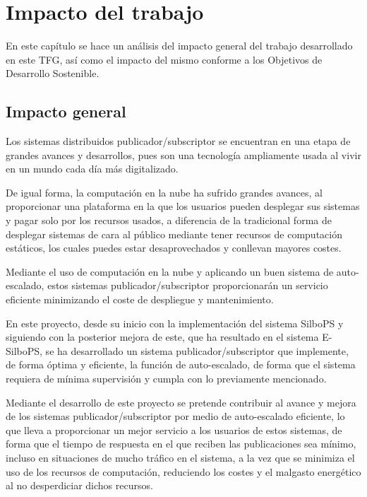 \chapter{Impacto del trabajo} \label{chp:impacto}

En este capítulo se hace un análisis del impacto general del trabajo 
desarrollado en este TFG, así como el impacto del mismo conforme a los 
Objetivos de Desarrollo Sostenible.


\section{Impacto general} \label{sct:impacto_impactogeneral}

Los sistemas distribuidos publicador/subscriptor se encuentran en una etapa de
grandes avances y desarrollos, pues son una tecnología ampliamente usada al 
vivir en un mundo cada día más digitalizado. 

De igual forma, la computación en la nube ha sufrido grandes avances, al 
proporcionar una plataforma en la que los usuarios pueden desplegar sus sistemas
y pagar solo por los recursos usados, a diferencia de la tradicional forma de 
desplegar sistemas de cara al público mediante tener recursos de computación 
estáticos, los cuales puedes estar desaprovechados y conllevan mayores costes.

Mediante el uso de computación en la nube y aplicando un buen sistema de 
auto-escalado, estos sistemas publicador/subscriptor proporcionarán un servicio
eficiente minimizando el coste de despliegue y mantenimiento.

En este proyecto, desde su inicio con la implementación del sistema
SilboPS\cite{thesis:tesisSVavassori} y siguiendo con la posterior mejora de 
este, que ha resultado en el sistema 
E-SilboPS\cite{tfm:victor2017}\cite{thesis:tesisVictor}, se ha desarrollado 
un sistema publicador/subscriptor que implemente, de forma óptima 
y eficiente, la función de auto-escalado, de forma que el sistema requiera
de mínima supervisión y cumpla con lo previamente mencionado.

Mediante el desarrollo de este proyecto se pretende contribuir al avance y 
mejora de los sistemas publicador/subscriptor por medio de auto-escalado 
eficiente, lo que lleva a proporcionar un mejor servicio a los usuarios de
estos sistemas, de forma que el tiempo de respuesta en el que reciben las
publicaciones sea mínimo, incluso en situaciones de mucho tráfico en el 
sistema, a la vez que se minimiza el uso de los recursos de computación,
reduciendo los costes y el malgasto energético al no desperdiciar dichos 
recursos.


